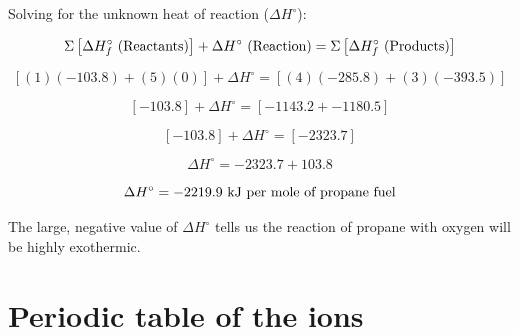 Solving for the unknown heat of reaction ($\Delta H^{\circ}$):

$$\Sigma \left[ \Delta H_f^{\circ} \hbox{ (Reactants)} \right] + \Delta H^{\circ} \hbox{ (Reaction)} = \Sigma \left[ \Delta H_f^{\circ} \hbox{ (Products)} \right] $$

$$\left[ (1)(-103.8) + (5)(0) \right] + \Delta H^{\circ} = \left[ (4)(-285.8) + (3)(-393.5) \right]$$

$$\left[ -103.8 \right] + \Delta H^{\circ} = \left[ -1143.2 + -1180.5 \right]$$

$$\left[ -103.8 \right] + \Delta H^{\circ} = \left[ -2323.7 \right]$$

$$\Delta H^{\circ} = -2323.7 + 103.8$$

$$\Delta H^{\circ} = -2219.9 \hbox{ kJ per mole of propane fuel}$$

The large, negative value of $\Delta H^{\circ}$ tells us the reaction of propane with oxygen will be highly exothermic.




































\filbreak
\section{Periodic table of the ions}

